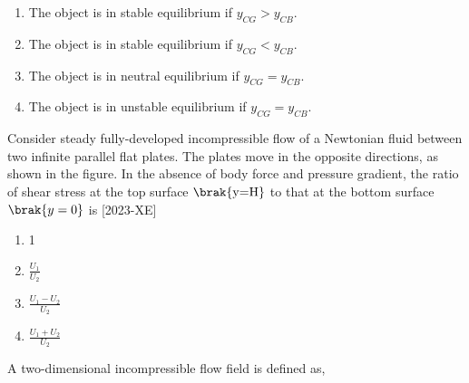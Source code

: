 \begin{enumerate}
    \item The object is in stable equilibrium if $y_{CG}>y_{CB}$.\\
    \item The object is in stable equilibrium if $y_{CG}<y_{CB}$.\\
    \item The object is in neutral equilibrium if $y_{CG}=y_{CB}$.\\
    \item The object is in unstable equilibrium if $y_{CG}=y_{CB}$.\\
\end{enumerate}
\item Consider steady fully-developed incompressible flow of a Newtonian fluid between two infinite parallel flat plates. The plates move in the opposite directions, as shown in the figure. In the absence of body force and pressure gradient, the ratio of shear stress at the top surface $\brak{\text{y=H}}$ to that at the bottom surface $\brak{y=0}$ is \hfill{[2023-XE]}\\
\begin{enumerate}
    \item 1\\
    \item $\frac{U_1}{U_2}$\\
    \item $\frac{U_1 - U_2}{U_2}$\\
    \item $\frac{U_1 + U_2}{U_2}$\\
\end{enumerate}  
\item A two-dimensional incompressible flow field is defined as, \\
